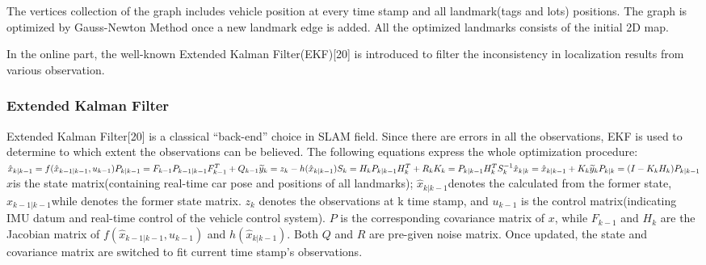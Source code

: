 \documentclass[journal]{IEEEtran}
\begin{document}
The vertices collection of the graph includes vehicle position at every time stamp and all landmark(tags and lots) positions. The graph is optimized by Gauss-Newton Method once a new landmark edge is added. All the optimized landmarks consists of the initial 2D map.

In the online part, the well-known Extended Kalman Filter(EKF)[20] is introduced to filter the inconsistency in localization results from various observation. 

\subsubsection{Extended Kalman Filter}
Extended Kalman Filter[20] is a classical “back-end” choice in SLAM field. Since there are errors in all the observations, EKF is used to determine to which extent the observations can be believed. The following equations express the whole optimization procedure:
$
{\hat x}_{k|k-1}=f({\hat x}_{k-1|k-1},{u}_{k-1})\\
{P}_{k|k-1} = {F}_{k-1}{P}_{k-1|k-1}{F}_{k-1}^{T}+{Q}_{k-1}\\
\\
{\widetilde y}_{k}={z}_{k}-h({\hat x}_{k|k-1})\\
{S}_{k}={H}_{k}{P}_{k|k-1}{H}_{k}^{T}+{R}_{k}\\
{K}_{k}={P}_{k|k-1}{H}_{k}^{T}{S}_{k}^{-1}\\
{\hat x}_{k|k}={\hat x}_{k|k-1}+{K}_{k}{\widetilde y}_{k}\\
{P}_{k|k}=(I-{K}_{k}{H}_{k}){P}_{k|k-1}\\
$
\\
 $x$is the state matrix(containing real-time car pose and positions of all landmarks);  ${\hat x}_{k|k-1}$denotes the  calculated from the former state, ${\hat x}_{k-1|k-1}$while denotes the former state matrix.  $z_k$ denotes the observations at k time stamp, and $u_{k-1}$ is the control matrix(indicating IMU datum and real-time control of the vehicle control system). $P$ is the corresponding covariance matrix of $x$, while $F_{k-1}$ and $H_k$ are the Jacobian matrix of $f({\hat x}_{k-1|k-1},{u}_{k-1})$ and $h({\hat x}_{k|k-1})$. Both $Q$ and $R$ are pre-given noise matrix. Once updated, the state and covariance matrix are switched to fit current time stamp’s observations.
\end{document}
